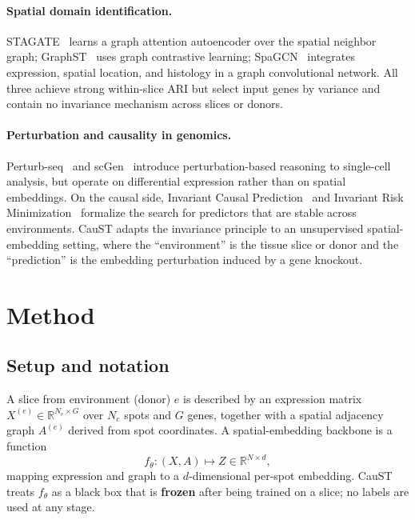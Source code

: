 \documentclass[11pt]{article}
\begin{document}
\paragraph{Spatial domain identification.}
STAGATE~\citep{dong2022} learns a graph attention autoencoder over the spatial
neighbor graph; GraphST~\citep{long2023} uses graph contrastive learning; SpaGCN~\citep{hu2021}
integrates expression, spatial location, and histology in a graph convolutional
network. All three achieve strong within-slice ARI but select input genes by
variance and contain no invariance mechanism across slices or donors.

\paragraph{Perturbation and causality in genomics.}
Perturb-seq~\citep{dixit2016} and scGen~\citep{lotfollahi2019} introduce
perturbation-based reasoning to single-cell analysis, but operate on
differential expression rather than on spatial embeddings. On the causal side,
Invariant Causal Prediction~\citep{peters2016} and Invariant Risk
Minimization~\citep{arjovsky2019} formalize the search for predictors that are
stable across environments. CauST adapts the invariance principle to an
unsupervised spatial-embedding setting, where the ``environment'' is the tissue
slice or donor and the ``prediction'' is the embedding perturbation induced by a
gene knockout.

\section{Method}
\label{sec:method}

\subsection{Setup and notation}
A slice from environment (donor) $e$ is described by an expression matrix
$X^{(e)} \in \mathbb{R}^{N_e \times G}$ over $N_e$ spots and $G$ genes, together
with a spatial adjacency graph $A^{(e)}$ derived from spot coordinates. A
spatial-embedding backbone is a function
\begin{equation}
f_\theta : (X, A) \mapsto Z \in \mathbb{R}^{N \times d},
\end{equation}
mapping expression and graph to a $d$-dimensional per-spot embedding. CauST
treats $f_\theta$ as a black box that is \textbf{frozen} after being trained on a
slice; no labels are used at any stage.
\end{document}
